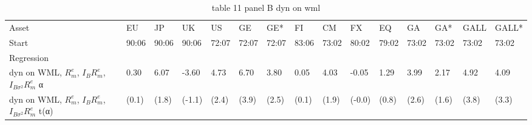 \begin{table}[htbp]
  \centering
  \caption{table 11 panel B dyn on wml}
  \label{tab:table_11_panel_B_dyn_on_wml}
  \begin{tabular}{lllllllllllllll}
\toprule
Asset & EU & JP & UK & US & GE & GE* & FI & CM & FX & EQ & GA & GA* & GALL & GALL* \\
Start & 90:06 & 90:06 & 90:06 & 72:07 & 72:07 & 72:07 & 83:06 & 73:02 & 80:02 & 79:02 & 73:02 & 73:02 & 73:02 & 73:02 \\
Regression &  &  &  &  &  &  &  &  &  &  &  &  &  &  \\
\midrule
dyn on WML, $R^e_m$, $I_B R^e_m$, $I_{B\sigma^2} R^e_m$ α & 0.30 & 6.07 & -3.60 & 4.73 & 6.70 & 3.80 & 0.05 & 4.03 & -0.05 & 1.29 & 3.99 & 2.17 & 4.92 & 4.09 \\
dyn on WML, $R^e_m$, $I_B R^e_m$, $I_{B\sigma^2} R^e_m$ t(α) & (0.1) & (1.8) & (-1.1) & (2.4) & (3.9) & (2.5) & (0.1) & (1.9) & (-0.0) & (0.8) & (2.6) & (1.6) & (3.8) & (3.3) \\
\bottomrule
\end{tabular}

\end{table}
